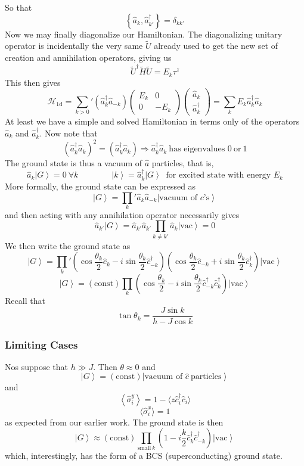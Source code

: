 \documentclass{article}
\newcommand{\ket}[1]{\left|#1\right>}
\begin{document}
	So that $$\left\{\hat{a}_k,\hat{a}_{k'}^\dagger\right\}=\delta_{kk'}$$
	Now we may finally diagonalize our Hamiltonian. The diagonalizing unitary operator is incidentally the very same $\tilde{U}$ already used to get the new set of creation and annihilation operators, giving us
	$$\tilde{U}^\dagger\tilde H\tilde{U}=E_k \tau^z$$
	This then gives
	$$\mathcal{H}_{\mathrm{1d}}={\sum_{k>0}}'(\hat{a}_k^\dagger \hat{a}_{-k})\begin{pmatrix}E_k & 0\\0&-E_k\end{pmatrix}\begin{pmatrix}\hat{a}_k\\\hat{a}_k^\dagger\end{pmatrix} =\sum_k E_k\hat{a}_k^\dagger \hat{a}_k$$
	At least we have a simple and solved Hamiltonian in terms only of the operators $\hat{a}_k$ and $\hat{a}_k^\dagger$. Now note that
	$$(\hat{a}_k^\dagger \hat{a}_k)^2=(\hat{a}_k^\dagger\hat{a}_k)\Rightarrow \hat{a}_k^\dagger\hat{a}_k\ \textrm{has eigenvalues }0\ \mathrm{or}\ 1$$
	The ground state is thus a vacuum of $\hat{a}$ particles, that is, 
	$$\hat{a}_k\ket{G}=0\ \forall k\qquad \qquad \ket{k}=\hat{a}_k^\dagger\ket{G}\ \textrm{ for excited state with energy }E_k$$
	More formally, the ground state can be expressed as
	$$\ket{G}={\prod_k}'\hat{a}_k\hat{a}_{-k}\ket{\textrm{vacuum of }c\textrm{'s}}$$
	and then acting with any annihilation operator necessarily gives
	$$\hat{a}_{k'}\ket{G}=\hat{a}_{k'}\hat{a}_{k'}\prod_{k\neq k'}\hat{a}_k\ket{\mathrm{vac}}=0$$
	We then write the ground state as
	$$\ket{G}={\prod_k}'\left(\cos\frac{\theta_k}{2}\hat{c}_k-i\sin\frac{\theta_k}{2}\hat{c}_{-k}^\dagger\right)\left(\cos\frac{\theta_k}{2}\hat{c}_{-k}+i\sin\frac{\theta_k}{2}\hat{c}_k^\dagger\right)\ket{\mathrm{vac}}$$
	$$\ket{G}=(\mathrm{const})\prod_k \left(\cos\frac{\theta_k}{2}-i\sin\frac{\theta_k}{2}\hat{c}_{-k}^\dagger\hat{c}_k^\dagger\right)\ket{\mathrm{vac}}$$
	Recall that 
	$$\tan\theta_k=\frac{J\sin k}{h-J\cos k}$$
	\subsubsection{Limiting Cases} Nos suppose that $h\gg J$. Then $\theta\approx 0$ and
	$$\ket{G}=(\mathrm{const})\ket{\textrm{vacuum of }\hat{c}\ \mathrm{particles}}$$
	and
	$$\left<\hat{\sigma}_i^y\right>=1-\langle z\hat{c}_i^\dagger\hat{c}_i\rangle$$
	$$\langle \hat{\sigma}_i^x\rangle=1$$
	as expected from our earlier work. The ground state is then
	$$\ket{G}\approx (\mathrm{const})\prod_{\mathrm{small}\ k}(1-i\frac{k}{2}\hat{c}_k^\dagger\hat{c}_{-k}^\dagger)\ket{\mathrm{vac}}$$
	which, interestingly, has the form of a BCS (superconducting) ground state.
	
\end{document}
